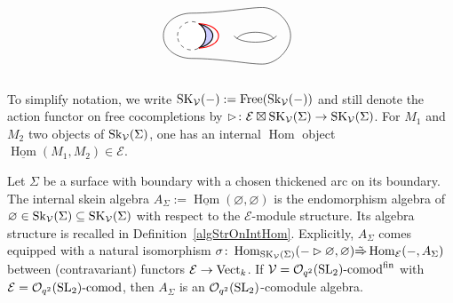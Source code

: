 \documentclass[pdftex]{sigma}%
\numberwithin{equation}{section}
\newcommand{\Free}{\operatorname{Free}}
\newcommand{\Hom}{\operatorname{Hom}}
\newcommand{\undHom}{\underline{\operatorname{Hom}}}
\newcommand{\Oq}{\mathcal{O}_{q^2}({\rm SL}_2)}
\begin{document}
$$\begin{tikzpicture}[yscale = 0.8, xscale = -0.8]
\begin{scope}[yshift = -3cm, xshift = 1cm]
\fill[white] (0.6,0.9) .. controls (0.7,0.7) and (1.8,0.7) .. (1.9,0.9) .. controls (1.7,1.2) and (0.8,1.2) .. (0.6,0.9);
\fill[white] (3.5,1) circle(0.5);
\fill[blue!20] (240:0.5)++(3.5,1) arc(240:120:0.5) arc(120:240:1 and 0.5);
\draw[dashed] (3.5,1) circle(0.5);
\draw[thick] (240:0.5)++(3.5,1) arc(240:120:0.5);
\draw[thick] (240:0.5)++(3.5,1) arc(240:120:1 and 0.5);
\draw[thick, red] (240:0.5)++(3.5,1) arc(270:90:0.7 and 0.43);
\draw (0.5,1) .. controls (0.7,0.7) and (1.8,0.7) .. (2,1);
\draw (0.6,0.9) .. controls (0.8,1.2) and (1.7,1.2) .. (1.9,0.9) node[midway, above right]{};
\draw (4.5,1) .. controls (4.5,0.5) and (4,0.2) .. (3.5,0.2)	.. controls (2.5,0.2) and (1.5,0 ) .. (1,0)	.. controls (0.5,0 ) and (0,0.5 ) .. (0,1)	.. controls (0,1.5 ) and (0.5,2 ) .. (1,2)	.. controls (1.5,2 ) and (2.5,1.8) .. (3.5,1.8) .. controls (4,1.8) and (4.5,1.5) .. (4.5,1);
\end{scope}
\end{tikzpicture}
$$
To simplify notation, we write ${\rm SK}_\mathcal{V}(-) := \Free({\rm Sk}_\mathcal{V}(-))$ and still denote the action functor on free cocompletions by $\rhd\colon \mathcal{E} \boxtimes {\rm SK}_\mathcal{V}(\Sigma)\to {\rm SK}_\mathcal{V}(\Sigma)$. For $M_1$ and $M_2$ two objects of ${\rm Sk}_\mathcal{V}(\Sigma)$, one has an internal $\Hom$ object $\undHom(M_1,M_2) \in \mathcal{E}$.

\begin{Definition}
Let $\Sigma$ be a surface with boundary with a chosen thickened arc on its boundary.
The internal skein algebra $A_\Sigma := \undHom(\varnothing,\varnothing)$ is the endomorphism algebra of $\varnothing \in {\rm Sk}_\mathcal{V}(\Sigma) \subseteq {\rm SK}_\mathcal{V}(\Sigma)$ with respect to the $\mathcal{E}$-module structure. Its algebra structure is recalled in Definition~\ref{algStrOnIntHom}.
Explicitly, $A_\Sigma$ comes equipped with a natural isomorphism $\sigma \colon \Hom_{{\rm SK}_\mathcal{V}(\Sigma)}(-\rhd \varnothing, \varnothing) \tilde{\Rightarrow} \Hom_{\mathcal{E}}(-, A_\Sigma)$ between (contravariant) functors $\mathcal{E}\to {\rm Vect}_k$.
If $\mathcal{V} = \Oq\text{-}{\rm comod}^{\rm fin}$ with $\mathcal{E}=\Oq\text{-}{\rm comod}$, then $A_\Sigma$ is an $\Oq$-comodule algebra.
\end{Definition}
\end{document}

